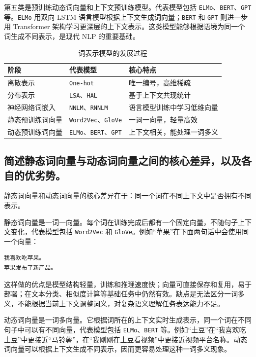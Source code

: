 第五类是预训练动态词向量和上下文预训练模型。代表模型包括 \texttt{ELMo}、\texttt{BERT}、\texttt{GPT} 等。\texttt{ELMo} 用双向 LSTM 语言模型根据上下文生成词向量；\texttt{BERT} 和 \texttt{GPT} 则进一步用 Transformer 架构学习更深层的上下文表示。这类模型能够根据语境为同一个词生成不同表示，是现代 NLP 的重要基础。

\begin{table}[H]
\centering
\small
\begin{tabular}{|p{}|p{}|p{}|}
\hline
阶段 & 代表模型 & 核心特点 \\ \hline
离散表示 & \texttt{One-hot} & 唯一编号，高维稀疏 \\ \hline
分布表示 & \texttt{LSA}、\texttt{HAL} & 基于上下文共现统计 \\ \hline
神经网络词嵌入 & \texttt{NNLM}、\texttt{RNNLM} & 语言模型训练中学习低维向量 \\ \hline
静态预训练词向量 & \texttt{Word2Vec}、\texttt{GloVe} & 一词一向量，轻量高效 \\ \hline
动态预训练词向量 & \texttt{ELMo}、\texttt{BERT}、\texttt{GPT} & 上下文相关，能处理一词多义 \\ \hline
\end{tabular}
\caption{词表示模型的发展过程}
\end{table}

\subsection{简述静态词向量与动态词向量之间的核心差异，以及各自的优劣势。}

静态词向量和动态词向量的核心差异在于：同一个词在不同上下文中是否拥有不同表示。

静态词向量是一词一向量。每个词在训练完成后都有一个固定向量，不随句子上下文变化，代表模型包括 \texttt{Word2Vec} 和 \texttt{GloVe}。例如“苹果”在下面两句话中会使用同一个向量：
\begin{Verbatim}[breaklines=true]
我喜欢吃苹果。
苹果发布了新产品。
\end{Verbatim}

这样做的优点是模型结构轻量，训练和推理速度快；向量可直接保存和复用，易于部署；在文本分类、相似度计算等基础任务中仍然有效。缺点是无法区分一词多义，不能根据当前上下文调整词义，对复杂语义理解任务表达能力不足。

动态词向量是一词多向量。它根据词所在的上下文实时生成表示，同一个词在不同句子中可以有不同向量，代表模型包括 \texttt{ELMo}、\texttt{BERT} 等。例如“土豆”在“我喜欢吃土豆”中更接近“马铃薯”，在“我刚刚在土豆看视频”中更接近视频平台名称。动态词向量可以根据上下文生成不同表示，因而更容易处理这种一词多义现象。

